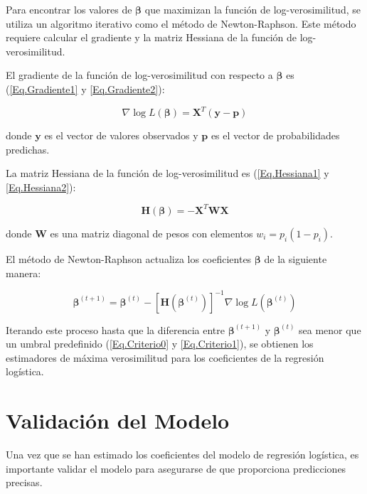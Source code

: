 \documentclass[a4paper]{report} %
\begin{document}
Para encontrar los valores de $\boldsymbol{\beta}$ que maximizan la funci\'on de log-verosimilitud, se utiliza un algoritmo iterativo como el m\'etodo de Newton-Raphson. Este m\'etodo requiere calcular el gradiente y la matriz Hessiana de la funci\'on de log-verosimilitud.


El gradiente de la funci\'on de log-verosimilitud con respecto a $\boldsymbol{\beta}$ es (\ref{Eq.Gradiente1} y \ref{Eq.Gradiente2}):

\begin{equation}
\nabla \log L(\boldsymbol{\beta}) = \mathbf{X}^T (\mathbf{y} - \mathbf{p})
\end{equation}

donde $\mathbf{y}$ es el vector de valores observados y $\mathbf{p}$ es el vector de probabilidades predichas.

La matriz Hessiana de la funci\'on de log-verosimilitud es (\ref{Eq.Hessiana1} y \ref{Eq.Hessiana2}):

\begin{equation}
\mathbf{H}(\boldsymbol{\beta}) = -\mathbf{X}^T \mathbf{W} \mathbf{X}
\end{equation}

donde $\mathbf{W}$ es una matriz diagonal de pesos con elementos $w_i = p_i (1 - p_i)$.

El m\'etodo de Newton-Raphson actualiza los coeficientes $\boldsymbol{\beta}$ de la siguiente manera:

\begin{equation}\label{Eq.Criterio3}
\boldsymbol{\beta}^{(t+1)} = \boldsymbol{\beta}^{(t)} - [\mathbf{H}(\boldsymbol{\beta}^{(t)})]^{-1} \nabla \log L(\boldsymbol{\beta}^{(t)})
\end{equation}

Iterando este proceso hasta que la diferencia entre $\boldsymbol{\beta}^{(t+1)}$ y $\boldsymbol{\beta}^{(t)}$ sea menor que un umbral predefinido (\ref{Eq.Criterio0} y  \ref{Eq.Criterio1}), se obtienen los estimadores de m\'axima verosimilitud para los coeficientes de la regresi\'on log\'istica.

\section{Validaci\'on del Modelo}

Una vez que se han estimado los coeficientes del modelo de regresi\'on log\'istica, es importante validar el modelo para asegurarse de que proporciona predicciones precisas.
\end{document}
